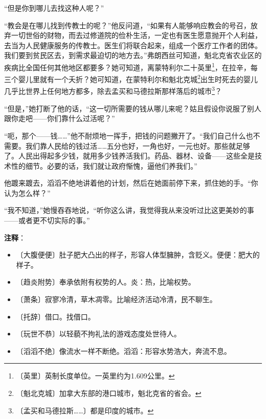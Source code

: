 \documentclass[12pt,UTF-8,openany]{ctexbook}
\begin{document}
\begin{normalsize}
    “但是你到哪儿去找这种人呢？”
    
    “教会是在哪儿找到传教士的呢？”他反问道，“如果有人能够响应教会的号召，放弃一切世俗的财物，而去过修道院的俭朴生活，一定也有医生愿意抛开个人利益，去当为人民健康服务的传教士。医生们将联合起来，组成一个医疗工作者的团体。我们要到贫民区去，到需求最迫切的地方去。”弗朗西丝可知道，魁北克省农业区的疾病比全国任何其他地区都要多？她可知道，离蒙特利尔二十英里\footnote{〔英里〕英制长度单位。一英里约为1.609公里。}，在拉辛，每三个婴儿里就有一个夭折？她可知道，在蒙特利尔和魁北克城\footnote{〔魁北克城〕加拿大东部的港口城市，魁北克省的省会。}出生时死去的婴儿几乎比世界上任何地方都多，除去孟买和马德拉斯那样落后的城市\footnote{〔孟买和马德拉斯……〕都是印度的城市。}？
    
    “但是，”她打断了他的话，“这一切所需要的钱从哪儿来呢？姑且假设你说服了别人跟你走吧——你们靠什么过活呢？”
    
    “呃，那个——钱……”他不耐烦地一挥手，把钱的问题撇开了。“我们自己什么也不需要。我们靠人民给的钱过活……五分也好，一角也好，一元也好。那些就足够了。人民出得起多少钱，就用多少钱养活我们。药品、器材、设备——这些全是技术性的细节。必要的话，我们就让政府惭愧，逼他们养我们。”
    
    他踱来踱去，滔滔不绝地讲着他的计划，然后在她面前停下来，抓住她的手。“你认为怎么样？”
    
    “我不知道，”她慢吞吞地说，“听你这么讲，我觉得我从来没听过比这更美妙的事——或者更不切实际的事。”
    
\end{normalsize}


\newpage

\textbf{注释}：

\vspace{-1em}

\begin{itemize}
    \setlength\itemsep{-0.2em}
    \item 〔大腹便便〕肚子肥大凸出的样子，形容人体型臃肿，含贬义。便便：肥大的样子。
    \item 〔趋炎附势〕奉承依附有权势的人。炎：热，比喻权势。
    \item 〔萧条〕寂寥冷清，草木凋零。比喻经济活动冷清，民不聊生。
    \item 〔托辞〕借口。找借口。
    \item 〔玩世不恭〕以轻藐不拘礼法的游戏态度处世待人。
    \item 〔滔滔不绝〕像流水一样不断绝。滔滔：形容水势浩大，奔流不息。
\end{itemize}
\end{document}
